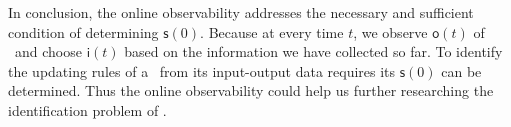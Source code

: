 
In conclusion, the online observability addresses the necessary and sufficient condition of determining $\mathsf{s}(0)$. Because at every time $t$, we observe $\mathsf{o}(t)$ of \BCN\ and choose $\mathsf{i}(t)$ based on the information we have collected so far. To identify the updating rules of a \BCN\  from its input-output data requires its $\mathsf{s}(0)$ can be determined. Thus the online observability could help us further researching the identification problem of \BCNs. 
